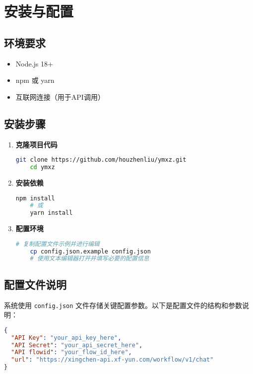 \documentclass[a4paper, 12pt]{article}
\begin{document}
\section{安装与配置}

\subsection{环境要求}
\begin{itemize}
    \item Node.js 18+
    \item npm 或 yarn
    \item 互联网连接（用于API调用）
\end{itemize}

\subsection{安装步骤}
\begin{enumerate}
    \item \textbf{克隆项目代码}
    \begin{lstlisting}[language=bash]
    git clone https://github.com/houzhenliu/ymxz.git
    cd ymxz
    \end{lstlisting}
    
    \item \textbf{安装依赖}
    \begin{lstlisting}[language=bash]
    npm install
    # 或
    yarn install
    \end{lstlisting}
    
    \item \textbf{配置环境}
    \begin{lstlisting}[language=bash]
    # 复制配置文件示例并进行编辑
    cp config.json.example config.json
    # 使用文本编辑器打开并填写必要的配置信息
    \end{lstlisting}
\end{enumerate}

\subsection{配置文件说明}
系统使用 \texttt{config.json} 文件存储关键配置参数。以下是配置文件的结构和参数说明：

\begin{lstlisting}[language=json, caption=config.json 示例]
{
  "API Key": "your_api_key_here",
  "API Secret": "your_api_secret_here",
  "API flowid": "your_flow_id_here",
  "url": "https://xingchen-api.xf-yun.com/workflow/v1/chat"
}
\end{lstlisting}
\end{document}
